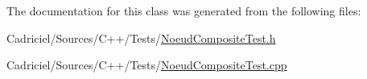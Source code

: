 The documentation for this class was generated from the following files\-:\begin{DoxyCompactItemize}
\item 
Cadriciel/\-Sources/\-C++/\-Tests/\hyperlink{_noeud_composite_test_8h}{Noeud\-Composite\-Test.\-h}\item 
Cadriciel/\-Sources/\-C++/\-Tests/\hyperlink{_noeud_composite_test_8cpp}{Noeud\-Composite\-Test.\-cpp}\end{DoxyCompactItemize}
